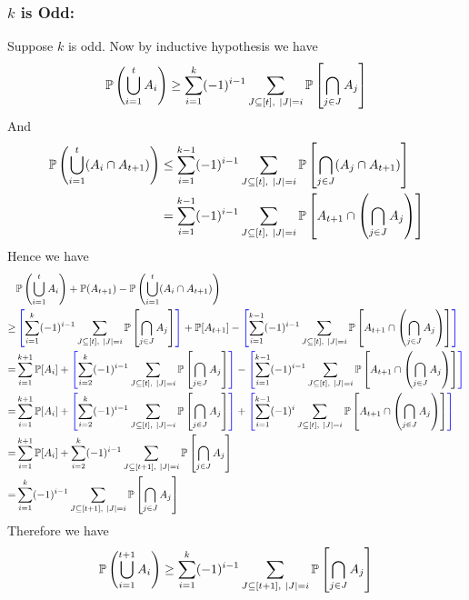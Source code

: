 \documentclass[a4paper, 11pt]{article}
\begin{document}
{\begin{enumerate}[label=(\alph*)]
\subsubsection*{$k$ is Odd:}
Suppose $k$ is odd. Now by inductive hypothesis we have $$\bbP\left(\bigcup_{i=1}^t A_i\right)
	\geq \sum\limits_{i=1}^k(-1)^{i-1}\sum\limits_{J\subseteq [t],\ |J|=i}\bbP\lt[\bigcap\limits_{j\in J}A_j\rt] $$
And \begin{align*}
	\bbP\left(\bigcup_{i=1}^t (A_i\cap A_{t+1})\right)& \leq  \sum\limits_{i=1}^{k-1}(-1)^{i-1}\sum\limits_{J\subseteq [t],\ |J|=i}\bbP\lt[ \bigcap_{j\in J}(A_j\cap A_{t+1}) \rt]\\
	& = \sum_{i=1}^{k-1}(-1)^{i-1}\sum_{J\subseteq [t],\ |J|=i}\bbP\lt[ A_{t+1}\cap\lt( \bigcap_{j\in J}A_j \rt)\rt]
\end{align*}
Hence we have \begin{align*}
	&\bbP\left(\bigcup_{i=1}^t A_i\right)+\bbP(A_{t+1})-\bbP\left(\bigcup_{i=1}^t (A_i\cap A_{t+1})\right)\\
	\geq &  \mathcolor{blue}{\left[}\sum\limits_{i=1}^k(-1)^{i-1}\sum\limits_{J\subseteq [t],\ |J|=i}\bbP\lt[\bigcap\limits_{j\in J}A_j\rt]\mathcolor{blue}{\right]}+\bbP[A_{t+1}]-\mathcolor{blue}{\left[}\sum_{i=1}^{k-1}(-1)^{i-1}\sum_{J\subseteq [t],\ |J|=i}\bbP\lt[ A_{t+1}\cap\lt( \bigcap_{j\in J}A_j \rt)\rt]\mathcolor{blue}{\right]}\\
	= & \sum_{i=1}^{k+1}\bbP[A_i]+ \mathcolor{blue}{\left[}\sum\limits_{i=2}^k(-1)^{i-1}\sum\limits_{J\subseteq [t],\ |J|=i}\bbP\lt[\bigcap\limits_{j\in J}A_j\rt]\mathcolor{blue}{\right]}-\mathcolor{blue}{\left[}\sum_{i=1}^{k-1}(-1)^{i-1}\sum_{J\subseteq [t],\ |J|=i}\bbP\lt[ A_{t+1}\cap\lt( \bigcap_{j\in J}A_j \rt)\rt]\mathcolor{blue}{\right]}\\
	= & \sum_{i=1}^{k+1}\bbP[A_i]+ \mathcolor{blue}{\left[}\sum\limits_{i=2}^k(-1)^{i-1}\sum\limits_{J\subseteq [t],\ |J|=i}\bbP\lt[\bigcap\limits_{j\in J}A_j\rt]\mathcolor{blue}{\right]}+\mathcolor{blue}{\left[}\sum_{i=1}^{k-1}(-1)^{i}\sum_{J\subseteq [t],\ |J|=i}\bbP\lt[ A_{t+1}\cap\lt( \bigcap_{j\in J}A_j \rt)\rt]\mathcolor{blue}{\right]}\\
	= &  \sum_{i=1}^{k+1}\bbP[A_i]+ \sum\limits_{i=2}^k(-1)^{i-1}\sum\limits_{J\subseteq [t+1],\ |J|=i}\bbP\lt[\bigcap\limits_{j\in J}A_j\rt]\\
	= & \sum\limits_{i=1}^k(-1)^{i-1}\sum\limits_{J\subseteq [t+1],\ |J|=i}\bbP\lt[\bigcap\limits_{j\in J}A_j\rt]
\end{align*}Therefore we have $$\mathbb{P}\left(\bigcup_{i=1}^{t+1}A_i\right)\geq  \sum\limits_{i=1}^k(-1)^{i-1}\sum\limits_{J\subseteq [t+1],\ |J|=i}\mathbb{P}\left[\bigcap\limits_{j\in J}A_j\right]$$

\end{enumerate}}
\end{document}
